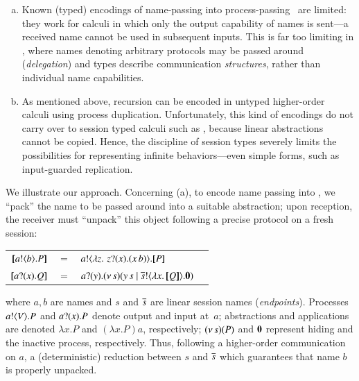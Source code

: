 \begin{enumerate}[a.]
\item Known (typed) encodings of name-passing into process-passing~\cite[Ch.13]{SaWabook} are limited: %
they work for %
calculi 
in which only the output capability of names is sent---a received name cannot be used in subsequent inputs.
This is far too limiting in \HOp, where 
 names denoting arbitrary protocols may be passed around (\emph{delegation})
and types describe  communication  \emph{structures}, rather than individual name capabilities. %

\item As mentioned above, 
recursion %
can be encoded in untyped higher-order calculi using process duplication. 
Unfortunately, this kind of encodings do not carry over to session typed calculi such as \HOp,
because linear abstractions cannot be copied. Hence, the discipline of session types severely limits 
the possibilities for representing infinite behaviors---even simple forms, such as input-guarded replication.
\end{enumerate}





\noi
We illustrate our approach. %
Concerning (a), %
to encode name passing into \HO, 
we ``pack''
the name to be passed around into a suitable abstraction; 
upon reception, the receiver must ``unpack'' this object following a precise protocol on a fresh  session:
\begin{center}
\begin{tabular}{rcll}
  $[\!\![a ! \langle b \rangle . P]\!\!]$	&$=$&	$a ! \langle  \lambda z.\,\,z ? (x) . (x\, {b})  \rangle . [\!\![P]\!\!]$ \\
  $[\!\![a ? (x) . Q]\!\!]$	&$=$&	$a ? (y) . (\nu\, s)(y\, {s} \;|\; \overline{s} ! \langle \lambda x.\,[\!\![Q]\!\!] \rangle . \mathbf{0})$
\end{tabular}
\end{center}
where
$a,b$ are names and $s$ and $\overline{s}$ are 
linear session names (\emph{endpoints}).
Processes $a ! \langle V \rangle . P$ and 
$a ? (x) . P$ denote output and input at~$a$;   
abstractions and applications are denoted
$\lambda x.P$ and $(\lambda x.P)a$, respectively;
$(\nu\, s)(P)$ and $\mathbf{0}$ represent hiding and the inactive process, respectively.
Thus, following a higher-order communication on $a$, %
a (deterministic) reduction between  
$s$ and $\overline{s}$ which guarantees that name $b$ is properly unpacked.

